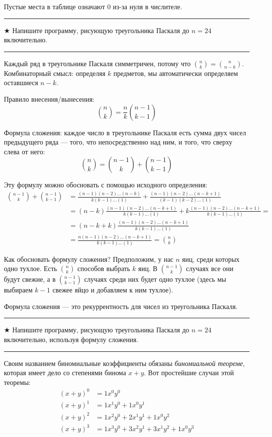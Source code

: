 \documentclass[14pt]{book}
\newenvironment{task}
 { \vspace{2ex}\hrule\vspace{2ex}$\bigstar$ }
 { \vspace{2ex}\hrule\vspace{2ex} }
\begin{document}
Пустые места в таблице означают $0$ из-за нуля в числителе.

\begin{task}
Напишите программу, рисующую треугольника Паскаля до $n=24$ включительно.
\end{task}

Каждый ряд в треугольнике Паскаля симметричен, потому что $\binom{n}{k}=\binom{n}{n-k}$.
Комбинаторный смысл: определяя $k$ предметов, мы автоматически определяем оставшиеся $n-k$.

Правило внесения/вынесения:
$$\binom{n}{k} = \frac{n}{k}\binom{n-1}{k-1}$$

Формула сложения: каждое число в треугольнике Паскаля есть сумма двух чисел предыдущего ряда ---
того, что непосредственно над ним, и того, что сверху слева от него:
\begin{equation}
\label{formula-binom-rec}
\binom{n}{k} = \binom{n-1}{k} + \binom{n-1}{k-1}
\end{equation}

Эту формулу можно обосновать с помощью исходного определения:
\begin{align*}
  \binom{n-1}{k} + \binom{n-1}{k-1} 
  &= \frac{(n-1)(n-2)\ldots(n-k)}{k(k-1)\ldots(1)} 
     + \frac{(n-1)(n-2)\ldots(n-k+1)}{(k-1)(k-2)\ldots(1)}  \\
  &= (n-k)\frac{(n-1)(n-2)\ldots(n-k+1)}{k(k-1)\ldots(1)} 
     + k\frac{(n-1)(n-2)\ldots(n-k+1)}{k(k-1)\ldots(1)} = \\
  &= (n-k+k)\frac{(n-1)(n-2)\ldots(n-k+1)}{k(k-1)\ldots(1)} \\
  &= \frac{n(n-1)(n-2)\ldots(n-k+1)}{k(k-1)\ldots(1)} = \binom{n}{k}
\end{align*}

Как обосновать формулу сложения? Предположим, у нас $n$ яиц, среди которых
одно тухлое. Есть $\binom{n}{k}$ способов выбрать $k$ яиц. В $\binom{n-1}{k}$
случаях все они будут свежие, а в $\binom{n-1}{k-1}$ случаях среди них будет
одно тухлое (здесь мы выбираем $k-1$ свежее яйцо и добавляем к ним тухлое).

Формула сложения --- это рекуррентность для чисел из треугольника Паскаля.

\begin{task}
Напишите программу, рисующую треугольника Паскаля до $n=24$ включительно,
используя формулу сложения.
\end{task}

Своим названием биномиальные коэффициенты обязаны \emph{биномиальной теореме}, которая
имеет дело со степенями бинома $x+y$. Вот простейшие случаи этой теоремы:
\begin{align*}
(x+y)^0 &= 1x^0y^0 \\
(x+y)^1 &= 1x^1y^0 + 1x^0y^1 \\
(x+y)^2 &= 1x^2y^0 + 2x^1y^1 + 1x^0y^2 \\
(x+y)^3 &= 1x^3y^0 + 3x^2y^1 + 3x^1y^2 + 1x^0y^3
\end{align*}
\end{document}
